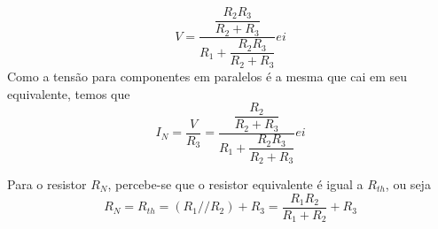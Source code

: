 \documentclass{article}
\numberwithin{equation}{section}
\newlength\Colsep
\let\dfr\dfrac
\begin{document}
    \vspace{1.2cm}

    \noindent\begin{minipage}{\textwidth}
    \begin{minipage}[c][4cm][c]{\dimexpr0.5\textwidth-0.5\Colsep\relax}
        \begin{center}
        \end{center}
    \end{minipage}
    \begin{minipage}[c][4cm][c]{\dimexpr0.5\textwidth-0.5\Colsep\relax}
        $$V=\dfr{\dfr{R_2R_3}{R_2+R_3}}{R_1+\dfr{R_2R_3}{R_2+R_3}}ei$$
        Como a tensão para componentes em paralelos é a mesma que cai em seu equivalente, temos que
        $$I_N=\frac{V}{R_3}=\dfr{\dfr{R_2}{R_2+R_3}}{R_1+\dfr{R_2R_3}{R_2+R_3}}ei$$
    \end{minipage}
    \end{minipage}

    \noindent\begin{minipage}{\textwidth}
    \begin{minipage}[c][4cm][c]{\dimexpr0.5\textwidth-0.5\Colsep\relax}
        \begin{center}
        \end{center}
    \end{minipage}
    \begin{minipage}[c][4cm][c]{\dimexpr0.5\textwidth-0.5\Colsep\relax}
        Para o resistor $R_N$, percebe-se que o resistor equivalente é igual a $R_{th}$, ou seja
        $$R_{N}=R_{th}=(R_1//R_2)+R_3=\frac{R_1R_2}{R_1+R_2}+R_3$$
    \end{minipage}
    \end{minipage}
\end{document}
